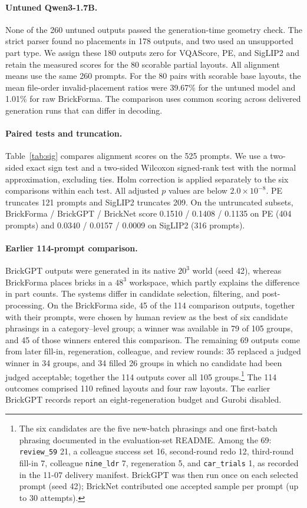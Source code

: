 \documentclass[letterpaper]{article} %
\begin{document}
\paragraph{Untuned Qwen3-1.7B.} None of the 260 untuned outputs passed the generation-time geometry check. The strict parser found no placements in 178 outputs, and two used an unsupported part type. We assign these 180 outputs zero for VQAScore, PE, and SigLIP2 and retain the measured scores for the 80 scorable partial layouts. All alignment means use the same 260 prompts. For the 80 pairs with scorable base layouts, the mean file-order invalid-placement ratios were 39.67\% for the untuned model and 1.01\% for raw BrickForma. The comparison uses common scoring across delivered generation runs that can differ in decoding.

\paragraph{Paired tests and truncation.}
Table~\ref{tab:sig} compares alignment scores on the 525 prompts. We use a two-sided exact sign test and a two-sided Wilcoxon signed-rank test with the normal approximation, excluding ties. Holm correction is applied separately to the six comparisons within each test. All adjusted $p$ values are below $2.0{\times}10^{-8}$. PE truncates 121 prompts and SigLIP2 truncates 209. On the untruncated subsets, BrickForma / BrickGPT / BrickNet score 0.1510 / 0.1408 / 0.1135 on PE (404 prompts) and 0.0340 / 0.0157 / 0.0009 on SigLIP2 (316 prompts).



\paragraph{Earlier 114-prompt comparison.} BrickGPT outputs were generated in its native $20^3$ world (seed 42), whereas BrickForma places bricks in a $48^3$ workspace, which partly explains the difference in part counts.
The systems differ in candidate selection, filtering, and post-processing.
On the BrickForma side, 45 of the 114 comparison outputs, together with their prompts, were chosen by human review as the best of six candidate phrasings in a category--level group; a winner was available in 79 of 105 groups, and 45 of those winners entered this comparison.
The remaining 69 outputs come from later fill-in, regeneration, colleague, and review rounds: 35 replaced a judged winner in 34 groups, and 34 filled 26 groups in which no candidate had been judged acceptable; together the 114 outputs cover all 105 groups.\footnote{The six candidates are the five new-batch phrasings and one first-batch phrasing documented in the evaluation-set README. Among the 69: \texttt{review\_59} 21, a colleague success set 16, second-round redo 12, third-round fill-in 7, colleague \texttt{nine\_ldr} 7, regeneration 5, and \texttt{car\_trials} 1, as recorded in the 11-07 delivery manifest. BrickGPT was then run once on each selected prompt (seed 42); BrickNet contributed one accepted sample per prompt (up to 30 attempts).}
The 114 outcomes comprised 110 refined layouts and four raw layouts. The earlier BrickGPT records report an eight-regeneration budget and Gurobi disabled.
\end{document}
